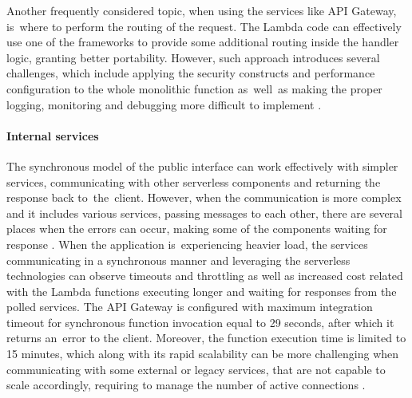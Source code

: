 Another frequently considered topic, when using the services like API Gateway, is~where to perform the routing of the request.
The Lambda code can effectively use one of the frameworks to provide some additional routing inside the handler logic, granting better portability.
However, such approach introduces several challenges, which include applying the security constructs and performance configuration to the whole monolithic function as~well~as making the proper logging, monitoring and debugging more difficult to implement \cite{AWSReinventBuildingMicroservicesWithAWSLambda}.

\paragraph{Internal services} \label{chapter:interal-services}

The synchronous model of the public interface can work effectively with simpler services, communicating with other serverless components and returning the response back to~the~client.
However, when the communication is more complex and it includes various services, passing messages to each other, there are several places when the errors can occur, making some of the components waiting for response \cite{AWSReinventBuildingMicroservicesWithAWSLambda}.
When the application is~experiencing heavier load, the services communicating in a synchronous manner and leveraging the serverless technologies can observe timeouts and throttling as well as increased cost related with the Lambda functions executing longer and waiting for responses from the polled services.
The API Gateway is configured with maximum integration timeout for synchronous function invocation equal to 29 seconds, after which it returns an~error to the client.
Moreover, the function execution time is limited to 15 minutes, which along with its rapid scalability can be more challenging when communicating with some external or legacy services, that are not capable to scale accordingly, requiring to manage the number of active connections \cite{ServerlessAtScaleDesignPatternsAndOptimizations}.

